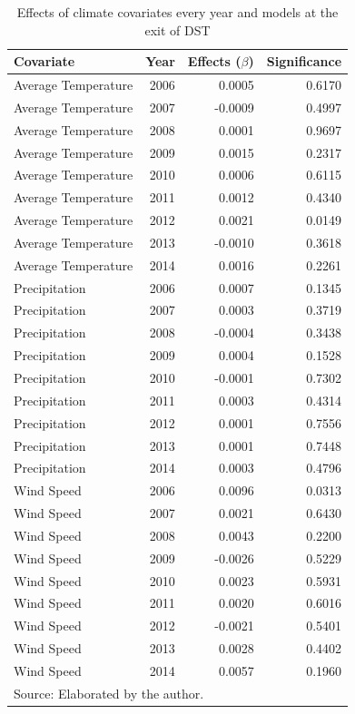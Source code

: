 \documentclass[12pt,openright,oneside,a4paper,english,french,spanish]{abntex2}
\numberwithin{table}{section} %
\numberwithin{figure}{section} %
\begin{document}
\begin{otherlanguage}{english}
\begin{table}[H]
\caption{Effects of climate covariates every year and models at the exit of DST}
\begin{center}
\begin{small}
\begin{tabular}{lrrr}
  \hline
Covariate & Year & Effects ($\beta$) & Significance \\ 
  \hline
Average Temperature &  2006 & 0.0005 & 0.6170 \\ 
Average Temperature &  2007 & -0.0009 & 0.4997 \\ 
Average Temperature &  2008 & 0.0001 & 0.9697 \\ 
Average Temperature &  2009 & 0.0015 & 0.2317 \\ 
Average Temperature &  2010 & 0.0006 & 0.6115 \\ 
Average Temperature &  2011 & 0.0012 & 0.4340 \\ 
Average Temperature &  2012 & 0.0021 & 0.0149 \\ 
Average Temperature &  2013 & -0.0010 & 0.3618 \\ 
Average Temperature &  2014 & 0.0016 & 0.2261 \\ 
Precipitation &  2006 & 0.0007 & 0.1345 \\ 
Precipitation &  2007 & 0.0003 & 0.3719 \\ 
Precipitation &  2008 & -0.0004 & 0.3438 \\ 
Precipitation &  2009 & 0.0004 & 0.1528 \\ 
Precipitation &  2010 & -0.0001 & 0.7302 \\ 
Precipitation &  2011 & 0.0003 & 0.4314 \\ 
Precipitation &  2012 & 0.0001 & 0.7556 \\ 
Precipitation &  2013 & 0.0001 & 0.7448 \\ 
Precipitation &  2014 & 0.0003 & 0.4796 \\ 
Wind Speed &  2006 & 0.0096 & 0.0313 \\ 
Wind Speed &  2007 & 0.0021 & 0.6430 \\ 
Wind Speed &  2008 & 0.0043 & 0.2200 \\ 
Wind Speed &  2009 & -0.0026 & 0.5229 \\ 
Wind Speed &  2010 & 0.0023 & 0.5931 \\ 
Wind Speed &  2011 & 0.0020 & 0.6016 \\ 
Wind Speed &  2012 & -0.0021 & 0.5401 \\ 
Wind Speed &  2013 & 0.0028 & 0.4402 \\ 
Wind Speed &  2014 & 0.0057 & 0.1960 \\ 
   \hline
\multicolumn{4}{l}{Source: Elaborated by the author.}
\end{tabular}
\end{small}
\end{center}
\label{tab:resultados_betas_saida_RS}
\end{table}


\end{otherlanguage}
\end{document}

